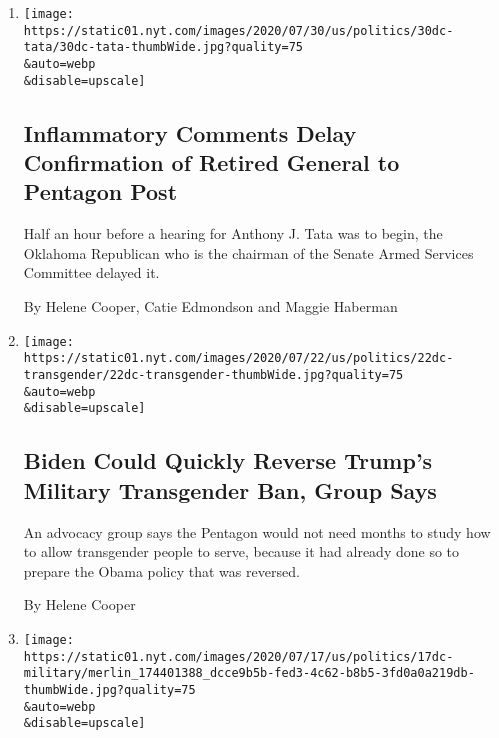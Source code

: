 \begin{enumerate}
\def\labelenumi{\arabic{enumi}.}
\item
  \href{/2020/07/30/us/politics/trump-inhofe-tata-pentagon.html}{}

  \texttt{[image: https://static01.nyt.com/images/2020/07/30/us/politics/30dc-tata/30dc-tata-thumbWide.jpg?quality=75\\\&auto=webp\\\&disable=upscale]}

  \hypertarget{inflammatory-comments-delay-confirmation-of-retired-general-to-pentagon-post}{%
  \subsection{Inflammatory Comments Delay Confirmation of Retired
  General to Pentagon
  Post}\label{inflammatory-comments-delay-confirmation-of-retired-general-to-pentagon-post}}

  Half an hour before a hearing for Anthony J. Tata was to begin, the
  Oklahoma Republican who is the chairman of the Senate Armed Services
  Committee delayed it.

  By Helene Cooper, Catie Edmondson and Maggie Haberman
\item
  \href{/2020/07/22/us/politics/military-transgender-trump-biden.html}{}

  \texttt{[image: https://static01.nyt.com/images/2020/07/22/us/politics/22dc-transgender/22dc-transgender-thumbWide.jpg?quality=75\\\&auto=webp\\\&disable=upscale]}

  \hypertarget{biden-could-quickly-reverse-trumps-military-transgender-ban-group-says}{%
  \subsection{Biden Could Quickly Reverse Trump's Military Transgender
  Ban, Group
  Says}\label{biden-could-quickly-reverse-trumps-military-transgender-ban-group-says}}

  An advocacy group says the Pentagon would not need months to study how
  to allow transgender people to serve, because it had already done so
  to prepare the Obama policy that was reversed.

  By Helene Cooper
\item
  \href{/2020/07/17/us/politics/pentagon-trump-confederate-symbols.html}{}

  \texttt{[image: https://static01.nyt.com/images/2020/07/17/us/politics/17dc-military/merlin\_174401388\_dcce9b5b-fed3-4c62-b8b5-3fd0a0a219db-thumbWide.jpg?quality=75\\\&auto=webp\\\&disable=upscale]}


\end{enumerate}
